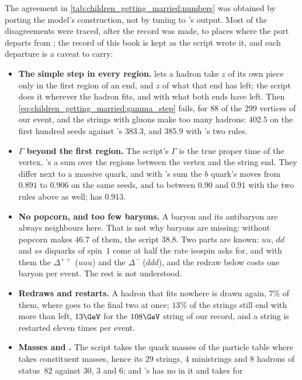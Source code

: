 The agreement in \cref{tab:children_getting_married:numbers} was obtained
by porting the model's construction, not by tuning to \PYTHIA's output.
Most of the disagreements were traced, after the record was made, to
places where the port departs from \PYTHIA; the record of this book is
kept as the script wrote it, and each departure is a caveat to carry:
\begin{itemize}
  \item \textbf{The simple step in every region.} \PYTHIA lets a hadron
    take $z$ of its own piece only in the first region of an end, and $z$
    of what that end has left; the script does it wherever the hadron
    fits, and with what both ends have left. Then
    \cref{eq:children_getting_married:gamma_step} fails, for $88$ of the
    $299$ vertices of our event, and the strings with gluons make too many
    hadrons: $402.5$ on the first hundred seeds against \PYTHIA's $383.3$,
    and $385.9$ with \PYTHIA's two rules.
  \item \textbf{$\Gamma$ beyond the first region.} The script's $\Gamma$ is
    the true proper time of the vertex, \PYTHIA's a sum over the regions
    between the vertex and the string end. They differ next to a massive
    quark, and with \PYTHIA's sum the $b$ quark's \xE moves from $0.891$
    to $0.906$ on the same seeds, and to between $0.90$ and $0.91$ with
    the two rules above as well; \PYTHIA has $0.913$.
  \item \textbf{No popcorn, and too few baryons.} A baryon and its
    antibaryon are always neighbours here. That is not why baryons are
    missing: without popcorn \PYTHIA makes $46.7$ of them, the script
    $38.8$. Two parts are known: $uu$, $dd$ and $ss$ diquarks of spin~$1$
    come at half the rate isospin asks for, and with them the
    $\Delta^{++}$ ($uuu$) and the $\Delta^-$ ($ddd$), and the redraw below
    costs one baryon per event. The rest is not understood.
  \item \textbf{Redraws and restarts.} A hadron that fits nowhere is drawn
    again, $7\%$ of them, where \PYTHIA goes to the final two at once;
    $13\%$ of the strings still end with more than \Wmin left, $13\GeV$
    for the $108\GeV$ string of our record, and a string is restarted
    eleven times per event.
  \item \textbf{Masses and \Wmin.} The script takes the quark masses of
    the particle table where \PYTHIA takes constituent masses, hence its
    $29$ strings, $4$ ministrings and $8$ hadrons of status~$82$ against
    $30$, $3$ and $6$; and \PYTHIA's \Wmin has no \pt in it and takes for

\end{itemize}
